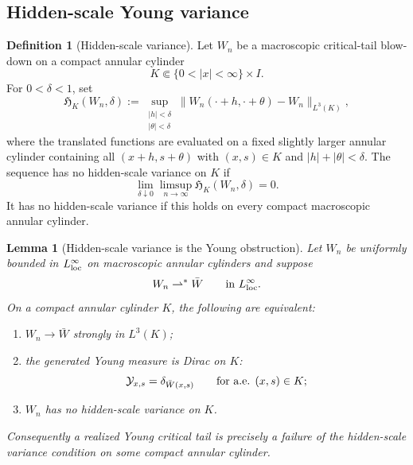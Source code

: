 \documentclass[11pt]{amsart}
\numberwithin{equation}{section}
\theoremstyle{plain}
\newtheorem{lemma}[theorem]{Lemma}
\theoremstyle{definition}
\newtheorem{definition}[theorem]{Definition}
\theoremstyle{remark}
\begin{document}
\subsection{Hidden-scale Young variance}
\label{subsec:hidden-scale-young-variance}

\begin{definition}[Hidden-scale variance]
\label{def:hidden-scale-variance}
Let \(W_n\) be a macroscopic critical-tail blow-down on a compact annular
cylinder
\[
   K\Subset\{0<|x|<\infty\}\times I .
\]
For \(0<\delta<1\), set
\[
   \mathfrak H_K(W_n,\delta)
   :=
   \sup_{\substack{|h|<\delta\\ |\theta|<\delta}}
   \|W_n(\cdot+h,\cdot+\theta)-W_n\|_{L^3(K)} ,
\]
where the translated functions are evaluated on a fixed slightly larger
annular cylinder containing all \((x+h,s+\theta)\) with
\((x,s)\in K\) and \(|h|+|\theta|<\delta\).  The sequence has no hidden-scale
variance on \(K\) if
\[
   \lim_{\delta\downarrow0}\limsup_{n\to\infty}
   \mathfrak H_K(W_n,\delta)=0 .
\]
It has no hidden-scale variance if this holds on every compact macroscopic
annular cylinder.
\end{definition}

\begin{lemma}[Hidden-scale variance is the Young obstruction]
\label{lem:hidden-variance-young-obstruction}
Let \(W_n\) be uniformly bounded in \(L^\infty_{\rm loc}\) on macroscopic
annular cylinders and suppose
\[
   W_n\rightharpoonup^\ast \bar W
   \qquad\hbox{in }L^\infty_{\rm loc}.
\]
On a compact annular cylinder \(K\), the following are equivalent:
\begin{enumerate}[label=\textup{(\roman*)}]
   \item \(W_n\to\bar W\) strongly in \(L^3(K)\);
   \item the generated Young measure is Dirac on \(K\):
   \[
      \mathcal Y_{x,s}=\delta_{\bar W(x,s)}
      \qquad\hbox{for a.e. }(x,s)\in K;
   \]
   \item \(W_n\) has no hidden-scale variance on \(K\).
\end{enumerate}
Consequently a realized Young critical tail is precisely a failure of the
hidden-scale variance condition on some compact annular cylinder.
\end{lemma}
\end{document}
